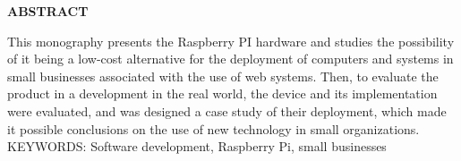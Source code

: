 \begin{center}
\textbf{ABSTRACT}
\end{center}

\singlespacing

\noindent This monography presents the Raspberry PI hardware and studies the possibility  of it being a low-cost alternative 
for the deployment of computers and systems in small businesses associated with the use of web systems. Then, to evaluate the product in a 
development in the real world, the device and its implementation were evaluated, and was designed a case study of their deployment, which made it possible 
conclusions on the use of new technology in small organizations. \\

\noindent KEYWORDS: Software development, Raspberry Pi, small businesses